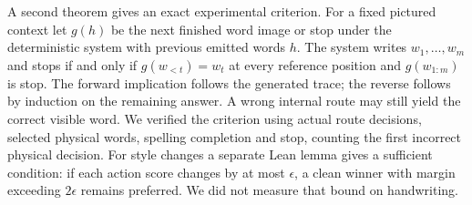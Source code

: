 A second theorem gives an exact experimental criterion. For a fixed pictured context let $g(h)$ be the next finished word image or stop under the deterministic system with previous emitted words $h$. The system writes $w_1,\ldots,w_m$ and stops if and only if $g(w_{<t})=w_t$ at every reference position and $g(w_{1:m})$ is stop. The forward implication follows the generated trace; the reverse follows by induction on the remaining answer. A wrong internal route may still yield the correct visible word. We verified the criterion using actual route decisions, selected physical words, spelling completion and stop, counting the first incorrect physical decision. For style changes a separate Lean lemma gives a sufficient condition: if each action score changes by at most $\epsilon$, a clean winner with margin exceeding $2\epsilon$ remains preferred. We did not measure that bound on handwriting.
